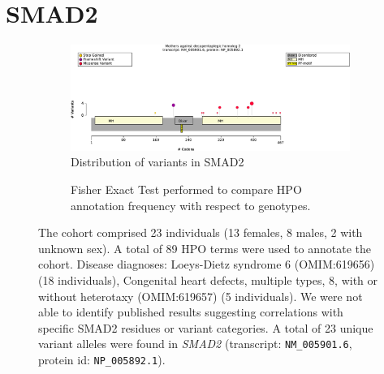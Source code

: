 \section*{SMAD2}

\begin{figure}[htbp]
\centering
\begin{subfigure}[b]{0.95\textwidth}
\centering
\includegraphics[width=\textwidth]{ img/SMAD2_protein_diagram.pdf} 
\captionsetup{justification=raggedright,singlelinecheck=false}
\caption{Distribution of variants in SMAD2}
\end{subfigure}

\vspace{2em}

\begin{subfigure}[b]{0.95\textwidth}
\centering
{}
\captionsetup{justification=raggedright,singlelinecheck=false}
\caption{Fisher Exact Test performed to compare HPO annotation frequency with respect to genotypes.}
\end{subfigure}

\vspace{2em}

\caption{ The cohort comprised 23 individuals (13 females, 8 males, 2 with unknown sex). A total of 89 HPO terms were used to annotate the cohort. Disease diagnoses: Loeys-Dietz syndrome 6 (OMIM:619656) (18 individuals), Congenital heart defects, multiple types, 8, with or without heterotaxy (OMIM:619657) (5 individuals). We were not able to identify published results suggesting correlations with specific SMAD2 residues or variant categories. A total of 23 unique variant alleles were found in \textit{SMAD2} (transcript: \texttt{NM\_005901.6}, protein id: \texttt{NP\_005892.1}).}
\end{figure}
